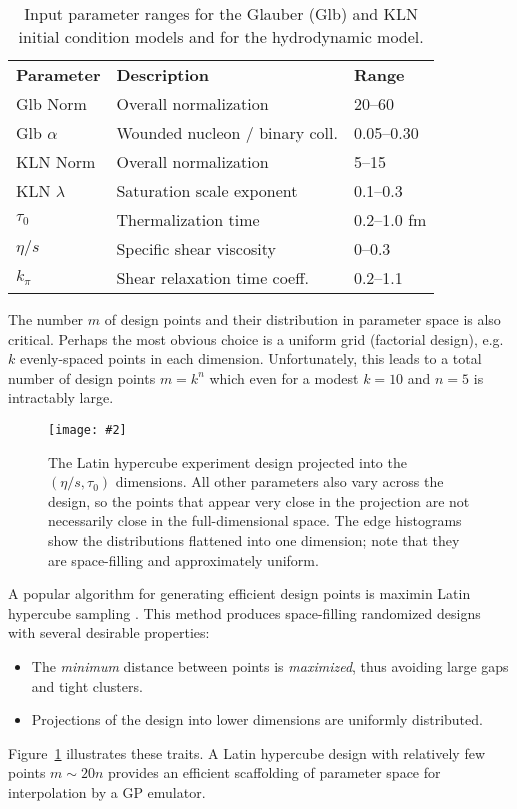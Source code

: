 \documentclass[aps,prc,reprint,superscriptaddress,amsmath]{revtex4-1}
\newcommand{\colfig}[3][t]{
  \begin{figure}[#1]
    \texttt{[image: \#2]}
    \caption{\label{fig:#2}#3}
  \end{figure}
}
\begin{document}
\begin{table}[b]
  \caption{
    \label{tab:design}
    Input parameter ranges for the Glauber (Glb) and KLN initial condition models and for the hydrodynamic model.
  }
  \begin{ruledtabular}
  \begin{tabular}{lll}
    \bf Parameter & \bf Description & \bf Range \\
    Glb Norm & Overall normalization & 20--60 \\
    Glb $\alpha$ & Wounded nucleon / binary coll. & 0.05--0.30 \\
    KLN Norm & Overall normalization & 5--15 \\
    KLN $\lambda$ & Saturation scale exponent & 0.1--0.3 \\
    $\tau_0$ & Thermalization time & 0.2--1.0 fm \\
    $\eta/s$ & Specific shear viscosity & 0--0.3 \\
    $k_\pi$ & Shear relaxation time coeff. & 0.2--1.1 \\
  \end{tabular}
  \end{ruledtabular}
\end{table}

The number $m$ of design points and their distribution in parameter space is also critical.
Perhaps the most obvious choice is a uniform grid (factorial design), e.g.\ $k$ evenly-spaced points in each dimension.
Unfortunately, this leads to a total number of design points $m = k^n$ which even for a modest $k = 10$ and $n = 5$ is intractably large.

\colfig[t]{design}{
  The Latin hypercube experiment design projected into the $(\eta/s, \tau_0)$ dimensions.
  All other parameters also vary across the design, so the points that appear very close in the projection are not necessarily close in the full-dimensional space.
  The edge histograms show the distributions flattened into one dimension; note that they are space-filling and approximately uniform.
}

A popular algorithm for generating efficient design points is maximin Latin hypercube sampling \cite{Morris:1995lh}.
This method produces space-filling randomized designs with several desirable properties:
\begin{itemize}
  \item The \emph{minimum} distance between points is \emph{maximized}, thus avoiding large gaps and tight clusters.
  \item Projections of the design into lower dimensions are uniformly distributed.
\end{itemize}
Figure~\ref{fig:design} illustrates these traits.
A Latin hypercube design with relatively few points $m \sim 20n$ provides an efficient scaffolding of parameter space for interpolation by a GP emulator.
\end{document}
